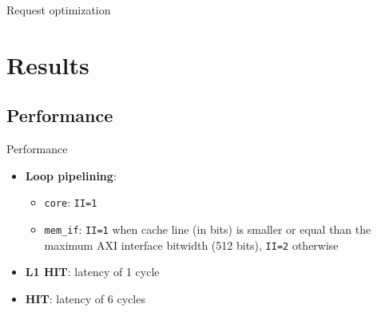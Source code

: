 \documentclass[handout]{beamer}
\begin{document}
\begin{frame}{Request optimization}
\begin{minipage}{.28\textwidth}
\begin{center}
		\end{center}
	\end{minipage}
\end{frame}
\section{Results}
\subsection{Performance}
\begin{frame}{Performance}
	\begin{itemize}
		\item \textbf{Loop pipelining}:
			\begin{itemize}
				\item \texttt{core}: \texttt{II=1}
				\item \texttt{mem\_if}: \texttt{II=1} when cache
					line (in bits) is smaller or equal than
					the maximum AXI interface bitwidth (512 bits),
					\texttt{II=2} otherwise
			\end{itemize}
		\item \textbf{L1 HIT}: latency of 1 cycle
		\item \textbf{HIT}: latency of 6 cycles
	\end{itemize}
\end{frame}
\end{document}

